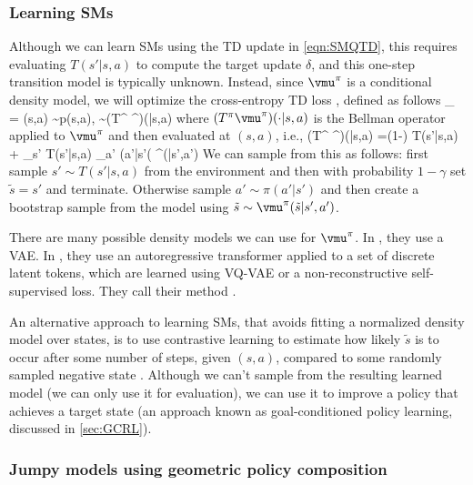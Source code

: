 \subsubsection{Learning SMs}

Although we can learn SMs
using the TD
update in \cref{eqn:SMQTD},
this requires evaluating
$T(s'|s,a)$ to compute the target update $\delta$,
and this one-step transition model is typically unknown.
Instead, since $\vmu^{\pi}$ is a conditional density model,
we will optimize
the cross-entropy TD loss
\citep{Janner2020}, defined as follows
\be
\loss_{\mu} = 
     {(s,a) \sim p(s,a),
        \sim (T^{\pi} \vmu^{\pi})(\cdot|s,a)}
\ee
where $(T^{\pi} \vmu^{\pi})(\cdot|s,a)$ is the Bellman
operator applied to $\vmu^{\pi}$ and then evaluated
at $(s,a)$, i.e.,
\be
(T^{\pi} \vmu^{\pi})(|s,a)
=(1-\gamma) T(s'|s,a) + \gamma \sum_{s'}
T(s'|s,a) \sum_{a'} \pi(a'|s'( \vmu^{\pi}(|s',a')
\ee
We can sample from this as follows:
first sample $s' \sim T(s'|s,a)$ from the environment
and then
with probability $1-\gamma$ 
set $\tilde{s}=s'$ and terminate.
Otherwise sample $a' \sim \pi(a'|s')$
and then create a bootstrap sample
from the model using $\tilde{s} \sim \vmu^{\pi}(\tilde{s}|s',a')$.

There are many possible density models we can use for
$\vmu^{\pi}$.
In \citep{Thakoor2022}, they use a VAE.
In \citep{Tomar2024}, they use
an autoregressive transformer applied
to a set of  discrete
latent tokens, which are learned using VQ-VAE or
a non-reconstructive self-supervised loss.
They call their method .


An alternative approach to learning SMs, that avoids fitting a normalized
density model over states, is to use contrastive learning
to estimate how likely $\tilde{s}$ is to occur
after some number of steps, given $(s,a)$,
compared to some randomly sampled negative state
\citep{Eysenbach2021C,Zheng2024contrastive}.
Although we can't sample from the resulting learned model
(we can only use it for evaluation),
we can use it to improve a policy that achieves
a target state (an approach known as
goal-conditioned policy learning,
discussed in \cref{sec:GCRL}).

\subsubsection{Jumpy models using  geometric policy composition}
\label{sec:jumpy}

